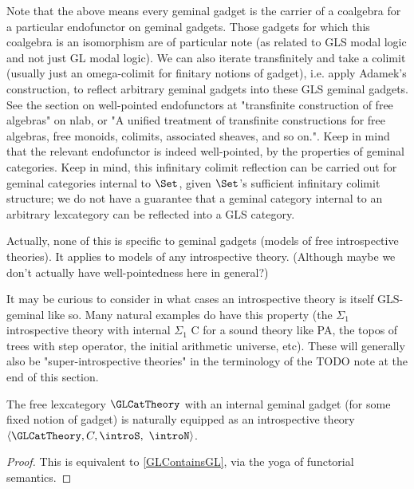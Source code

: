 \begin{TODOblock}
Note that the above means every geminal gadget is the carrier of a coalgebra for a particular endofunctor on geminal gadgets. Those gadgets for which this coalgebra is an isomorphism are of particular note (as related to GLS modal logic and not just GL modal logic). We can also iterate transfinitely and take a colimit (usually just an omega-colimit for finitary notions of gadget), i.e. apply Adamek's construction, to reflect arbitrary geminal gadgets into these GLS geminal gadgets. See the section on well-pointed endofunctors at "transfinite construction of free algebras" on nlab, or "A unified treatment of transfinite constructions for free algebras, free monoids, colimits, associated sheaves, and so on.". Keep in mind that the relevant endofunctor is indeed well-pointed, by the properties of geminal categories. Keep in mind, this infinitary colimit reflection can be carried out for geminal categories internal to $\Set$, given $\Set$'s sufficient infinitary colimit structure; we do not have a guarantee that a geminal category internal to an arbitrary lexcategory can be reflected into a GLS category.

Actually, none of this is specific to geminal gadgets (models of free introspective theories). It applies to models of any introspective theory. (Although maybe we don't actually have well-pointedness here in general?)

It may be curious to consider in what cases an introspective theory is itself GLS-geminal like so. Many natural examples do have this property (the $\Sigma_1$ introspective theory with internal $\Sigma_1$ C for a sound theory like PA, the topos of trees with step operator, the initial arithmetic universe, etc). These will generally also be "super-introspective theories" in the terminology of the TODO note at the end of this section.
\end{TODOblock}

\begin{corollary}\label{GLCatTheoryIsIntrosp}
The free lexcategory $\GLCatTheory$ with an internal geminal gadget (for some fixed notion of gadget) is naturally equipped as an introspective theory $\langle \GLCatTheory, C, \introS, $ $\introN \rangle$.
\end{corollary}
\begin{proof}
This is equivalent to \cref{GLContainsGL}, via the yoga of functorial semantics.
\end{proof}

